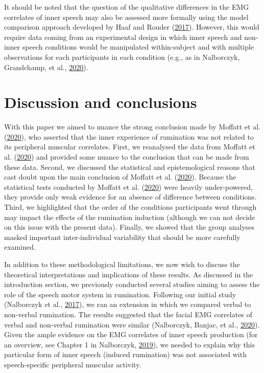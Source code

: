 \documentclass[
  english,
  man, donotrepeattitle,floatsintext]{apa6}
\begin{document}
It should be noted that the question of the qualitative differences in the EMG correlates of inner speech may also be assessed more formally using the model comparison approach developed by Haaf and Rouder (\protect\hyperlink{ref-haaf_developing_2017}{2017}). However, this would require data coming from an experimental design in which inner speech and non-inner speech conditions would be manipulated within-subject and with multiple observations for each participants in each condition (e.g., as in Nalborczyk, Grandchamp, et al., \protect\hyperlink{ref-nalborczyk_can_2020}{2020}).

\hypertarget{discussion-and-conclusions}{%
\section{Discussion and conclusions}\label{discussion-and-conclusions}}

With this paper we aimed to nuance the strong conclusion made by Moffatt et al. (\protect\hyperlink{ref-moffatt_inner_2020}{2020}), who asserted that the inner experience of rumination was not related to its peripheral muscular correlates. First, we reanalysed the data from Moffatt et al. (\protect\hyperlink{ref-moffatt_inner_2020}{2020}) and provided some nuance to the conclusion that can be made from these data. Second, we discussed the statistical and epistemological reasons that cast doubt upon the main conclusion of Moffatt et al. (\protect\hyperlink{ref-moffatt_inner_2020}{2020}). Because the statistical tests conducted by Moffatt et al. (\protect\hyperlink{ref-moffatt_inner_2020}{2020}) were heavily under-powered, they provide only weak evidence for an absence of difference between conditions. Third, we highlighted that the order of the conditions participants went through may impact the effects of the rumination induction (although we can not decide on this issue with the present data). Finally, we showed that the group analyses masked important inter-individual variability that should be more carefully examined.

In addition to these methodological limitations, we now wish to discuss the theoretical interpretations and implications of these results. As discussed in the introduction section, we previously conducted several studies aiming to assess the role of the speech motor system in rumination. Following our initial study (Nalborczyk et al., \protect\hyperlink{ref-nalborczyk_orofacial_2017}{2017}), we ran an extension in which we compared verbal to non-verbal rumination. The results suggested that the facial EMG correlates of verbal and non-verbal rumination were similar (Nalborczyk, Banjac, et al., \protect\hyperlink{ref-nalborczyk_dissociating_2020}{2020}). Given the ample evidence on the EMG correlates of inner speech production (for an overview, see Chapter 1 in Nalborczyk, \protect\hyperlink{ref-nalborczyk_understanding_2019}{2019}), we needed to explain why this particular form of inner speech (induced rumination) was not associated with speech-specific peripheral muscular activity.
\end{document}
